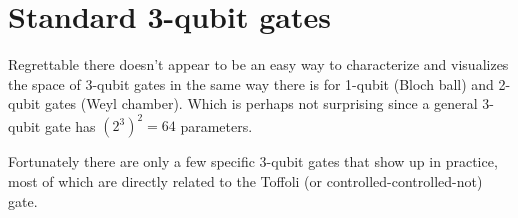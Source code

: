 

\clearpage

\section{Standard 3-qubit gates}

Regrettable there doesn't appear to be an easy way to characterize and visualizes the space of 3-qubit gates in the same way there is for 1-qubit (Bloch ball) and 2-qubit gates (Weyl chamber). Which is perhaps not surprising since a general 3-qubit gate has $(2^3)^2 = 64$ parameters. 

Fortunately there are only a few specific 3-qubit gates that show up in practice, most of which are directly related to the Toffoli (or controlled-controlled-not) gate.

